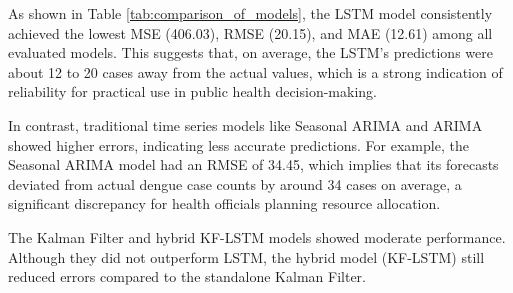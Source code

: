 \begin{table}[h!]
	\centering
	\caption{Comparison of different models for dengue prediction}
	\label{tab:comparison_of_models}
\end{table}

As shown in Table \ref{tab:comparison_of_models}, the LSTM model consistently achieved the lowest MSE (406.03), RMSE (20.15), and MAE (12.61) among all evaluated models. This suggests that, on average, the LSTM’s predictions were about 12 to 20 cases away from the actual values, which is a strong indication of reliability for practical use in public health decision-making.

In contrast, traditional time series models like Seasonal ARIMA and ARIMA showed higher errors, indicating less accurate predictions. For example, the Seasonal ARIMA model had an RMSE of 34.45, which implies that its forecasts deviated from actual dengue case counts by around 34 cases on average, a significant discrepancy for health officials planning resource allocation.

The Kalman Filter and hybrid KF-LSTM models showed moderate performance. Although they did not outperform LSTM, the hybrid model (KF-LSTM) still reduced errors compared to the standalone Kalman Filter.

